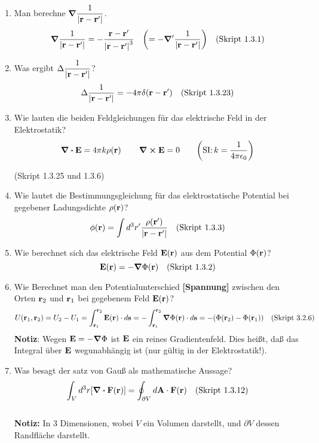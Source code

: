 \begin{enumerate}
  \item Man berechne $\displaystyle \grad\frac{1}{\abs{\vb{r}-\vb{r}'}}$.
        $$\displaystyle \grad\frac{1}{\abs{\vb{r}-\vb{r}'}}=
         -\frac{\vb r -\vb r'}{\abs{\vb r - \vb r'}^3}\quad
         \qty(=-\grad'\frac{1}{\abs{\vb{r}-\vb{r}'}})\quad\text{(Skript 1.3.1)}$$ 

  \item Was ergibt $\displaystyle \Delta\frac{1}{\abs{\vb{r}-\vb{r}'}}$?
        $$\displaystyle \Delta \frac{1}{\abs{\vb{r}-\vb{r}'}} = -4\pi \delta(\vb r-\vb r')
        \quad\text{(Skript 1.3.23)}$$
    
  \item Wie lauten die beiden Feldgleichungen für das 
        elektrische Feld in der Elektrostatik?
        $$\displaystyle \div \vb E=4\pi k\rho(\vb r)\,\qquad\curl\vb E=0
         \qquad\qty(\text{SI:}\,k=\frac{1}{4\pi\epsilon_0})$$
        \begin{center}
          (Skript 1.3.25 und 1.3.6)
        \end{center}
  
  \item Wie lautet die Bestimmungsgleichung für das elektrostatische 
        Potential bei gegebener Ladungsdichte $\rho(\vb r)$?
        $$\displaystyle \phi(\vb r)=\int d^3r'\frac{\rho(\vb r')}{\abs{\vb{r}-\vb{r}'}}
        \quad\text{(Skript 1.3.3)}$$

  \item Wie berechnet sich das elektrische Feld $\vb E (\vb r)$ aus dem
        Potential $\Phi(\vb r)$?
        $$\displaystyle \vb E(\vb r) = - \grad \Phi (\vb r)
        \quad\text{(Skript 1.3.2)}$$

  \item Wie Berechnet man den Potentialunterschied \textbf{[Spannung]}
        zwischen den Orten 
        $\vb r_2$ und $\vb r_1$ bei gegebenem Feld $\vb E(\vb r)$?
        $$\displaystyle U(\vb r_1, \vb r_2)=U_2-U_1
         =\int_{\vb r_1}^{\vb r_2} \vb E(\vb r)\cdot d\vb s
         =-\int_{\vb r_1}^{\vb r_2} \vb \grad \Phi (\vb r)\cdot d\vb s
         =-\qty(\Phi(\vb r_2)-\Phi(\vb r_1))
         \quad\text{(Skript 3.2.6)}$$
        \textbf{Notiz}: Wegen $\vb E=-\grad\Phi$ ist $\vb E$ ein reines
        Gradientenfeld. Dies heißt, daß das Integral über $\vb E$
        wegunabhängig ist (nur gültig in der Elektrostatik!).

  \item Was besagt der satz von Gauß als mathematische Aussage?
        $$\displaystyle \int_V d^3r \qty[\div \vb F(\vb r)]=
         \oint_{\partial V}d\vb A\cdot \vb F(\vb r)
         \quad\text{(Skript 1.3.12)}$$\\
        \textbf{Notiz:} In 3 Dimensionen, wobei $V$ ein Volumen darstellt,
        und $\partial V$ dessen Randfläche darstellt.


\end{enumerate}
